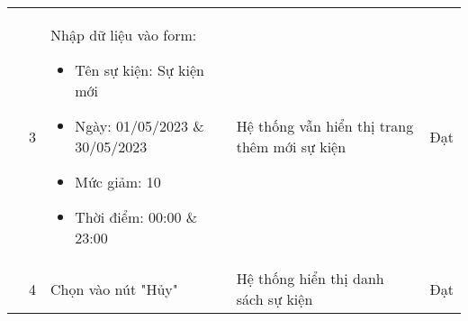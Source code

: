 {\begin{longtable}{| p{2.5cm}| p{1cm}| p{5.5cm}| p{4.5cm} | p{1.5cm} |}
        \cline{2-5}
        & 3 & Nhập dữ liệu vào form:
        \begin{itemize}
            \item Tên sự kiện: Sự kiện mới
            \item Ngày: 01/05/2023 \& 30/05/2023
            \item Mức giảm: 10
            \item Thời điểm: 00:00 \& 23:00 
        \end{itemize} & Hệ thống vẫn hiển thị trang thêm mới sự kiện & Đạt \\
        \cline{2-5}
         & 4 & Chọn vào nút "Hủy" & Hệ thống hiển thị danh sách sự kiện & Đạt \\
        \hline
    \end{longtable} 
}


